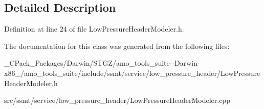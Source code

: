 \subsection{Detailed Description}


Definition at line 24 of file Low\+Pressure\+Header\+Modeler.\+h.



The documentation for this class was generated from the following files\+:\begin{DoxyCompactItemize}
\item 
\+\_\+\+C\+Pack\+\_\+\+Packages/\+Darwin/\+S\+T\+G\+Z/amo\+\_\+tools\+\_\+suite-\/-\/\+Darwin-\/x86\+\_/amo\+\_\+tools\+\_\+suite/include/ssmt/service/low\+\_\+pressure\+\_\+header/Low\+Pressure\+Header\+Modeler.\+h\item 
src/ssmt/service/low\+\_\+pressure\+\_\+header/Low\+Pressure\+Header\+Modeler.\+cpp\end{DoxyCompactItemize}
